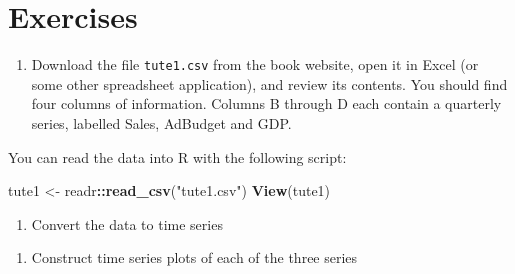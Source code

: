 \documentclass[]{book}
\newenvironment{Shaded}{\begin{snugshade}}{\end{snugshade}}
\newcommand{\KeywordTok}[1]{\textcolor[rgb]{0.13,0.29,0.53}{\textbf{#1}}}
\newcommand{\DataTypeTok}[1]{\textcolor[rgb]{0.13,0.29,0.53}{#1}}
\newcommand{\StringTok}[1]{\textcolor[rgb]{0.31,0.60,0.02}{#1}}
\newcommand{\OperatorTok}[1]{\textcolor[rgb]{0.81,0.36,0.00}{\textbf{#1}}}
\newcommand{\NormalTok}[1]{#1}
\providecommand{\tightlist}{%
  \setlength{\itemsep}{0pt}\setlength{\parskip}{0pt}}
\begin{document}
\section{Exercises}\label{exercises-4}

\begin{enumerate}
\def\labelenumi{\arabic{enumi}.}
\tightlist
\item
  Download the file \texttt{tute1.csv} from the book website, open it in
  Excel (or some other spreadsheet application), and review its
  contents. You should find four columns of information. Columns B
  through D each contain a quarterly series, labelled Sales, AdBudget
  and GDP.
\end{enumerate}

You can read the data into R with the following script:

\begin{Shaded}
\begin{Highlighting}[]
\NormalTok{tute1 <-}\StringTok{ }\NormalTok{readr}\OperatorTok{::}\KeywordTok{read_csv}\NormalTok{(}\StringTok{"tute1.csv"}\NormalTok{)}
\KeywordTok{View}\NormalTok{(tute1)}
\end{Highlighting}
\end{Shaded}

\begin{enumerate}
\def\labelenumi{\alph{enumi}.}
\tightlist
\item
  Convert the data to time series
\end{enumerate}

\begin{Shaded}
\end{Shaded}

\begin{enumerate}
\def\labelenumi{\alph{enumi}.}
\setcounter{enumi}{1}
\tightlist
\item
  Construct time series plots of each of the three series
\end{enumerate}
\end{document}
